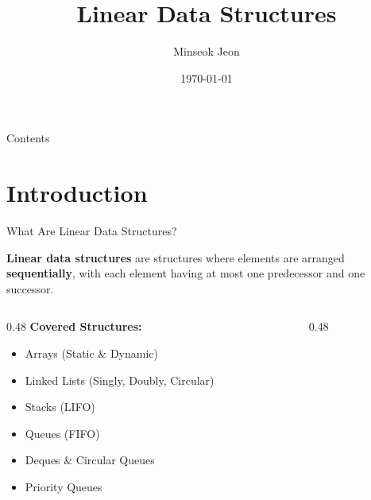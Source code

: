 \documentclass[aspectratio=169,xcolor=dvipsnames]{beamer}
\title[Linear Data Structures]{Linear Data Structures}
\author{Minseok Jeon}
\institute{DGIST}
\date{\today}
\begin{document}
\begin{frame}[plain]
  \titlepage
\end{frame}

\begin{frame}[plain]{Contents}
  \tableofcontents
\end{frame}

\section{Introduction}

\begin{frame}{What Are Linear Data Structures?}
  \begin{definition}
    \textbf{Linear data structures} are structures where elements are arranged \textbf{sequentially}, with each element having at most one predecessor and one successor.
  \end{definition}

  \vspace{0.5cm}

  \begin{columns}
    \begin{column}{0.48\textwidth}
      \textbf{Covered Structures:}
      \begin{itemize}
        \item Arrays (Static \& Dynamic)
        \item Linked Lists (Singly, Doubly, Circular)
        \item Stacks (LIFO)
        \item Queues (FIFO)
        \item Deques \& Circular Queues
        \item Priority Queues
      \end{itemize}
    \end{column}
    \begin{column}{0.48\textwidth}
\end{column}
\end{columns}
\end{frame}
\end{document}
